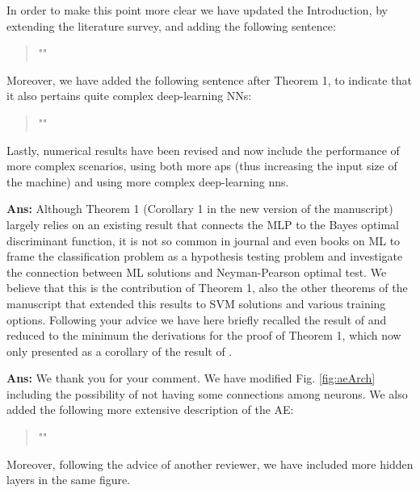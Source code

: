 \documentclass[draftcls,onecolumn,12pt]{IEEEtran}
\newcounter{revc}
\newcommand{\revp}[1]{\zref[revcontent]{#1}}
\begin{document}
{In order to make this point more clear we have updated the Introduction, by extending the literature survey, and adding the following sentence:
\begin{quote}
    "\revp{rev11a}"
\end{quote}

Moreover, we have added the following sentence after Theorem 1, to indicate that it also pertains quite complex deep-learning NNs:
\begin{quote}
    "\revp{rev11b}"
\end{quote}
 
Lastly, numerical results have been revised and now include the performance of more complex scenarios, using both more \acp{ap} (thus increasing the input size of the machine) and using more complex deep-learning \acp{nn}. 

\vspace{5mm} %
\begin{framed}
\end{framed}

{\bf Ans:} Although Theorem 1 (Corollary 1 in the new version of the manuscript) largely relies on an existing result that connects the MLP to the Bayes optimal discriminant function, it is not so common in journal and even books on ML to frame the classification problem as a hypothesis testing problem and investigate the connection between ML solutions and Neyman-Pearson optimal test. We believe that this is the contribution of Theorem 1, also the other theorems of the manuscript that extended this results to SVM solutions and various training options. Following your advice we have here briefly recalled the result of \cite{Ruck-90} and reduced to the minimum the derivations for the proof of Theorem 1, which now only presented as a corollary of the result of \cite{Ruck-90}.

\vspace{5mm} %
\begin{framed}
\end{framed}

{\bf Ans:}  We thank you for your comment. We have modified Fig. \ref{fig:aeArch} including the possibility of not having some connections among neurons. We also added the following more extensive description of the AE:
\begin{quote}
    "\revp{deep ae}"
\end{quote}
Moreover, following the advice of another reviewer, we have included more hidden layers in the same figure.

}
\end{document}
